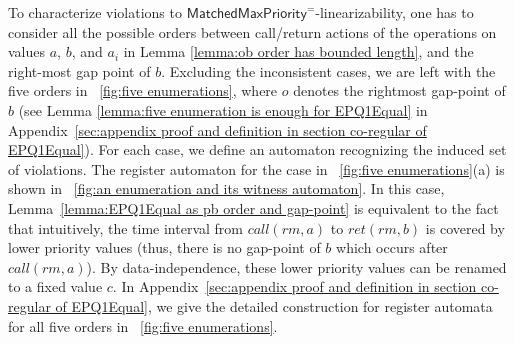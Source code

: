 To characterize violations to $\mathsf{MatchedMaxPriority}^{=}$-linearizability, one has to consider all the possible orders between call/return actions of the operations on values $a$, $b$, and $a_i$ in Lemma \ref{lemma:ob order has bounded length}, and the right-most gap point of $b$. Excluding the inconsistent cases, we are left with the five orders in \figurename~\ref{fig:five enumerations}, where $o$ denotes the rightmost gap-point of $b$ (see Lemma \ref{lemma:five enumeration is enough for EPQ1Equal} in Appendix~\ref{sec:appendix proof and definition in section co-regular of EPQ1Equal}).
For each case, we define an automaton recognizing the induced set of violations. The register automaton for the case in \figurename~\ref{fig:five enumerations}(a) is shown in \figurename~\ref{fig:an enumeration and its witness automaton}. In this case, Lemma~\ref{lemma:EPQ1Equal as pb order and gap-point} is equivalent to the fact that intuitively, the time interval from $\textit{call}(\textit{rm},a)$ to $\textit{ret}(\textit{rm},b)$ is covered by lower priority values (thus, there is no gap-point of $b$ which occurs after $\textit{call}(\textit{rm},a)$). By data-independence, these lower priority values can be renamed to a fixed value $c$. In Appendix~\ref{sec:appendix proof and definition in section co-regular of EPQ1Equal}, we give the detailed construction for register automata for all five orders in \figurename~\ref{fig:five enumerations}. 


